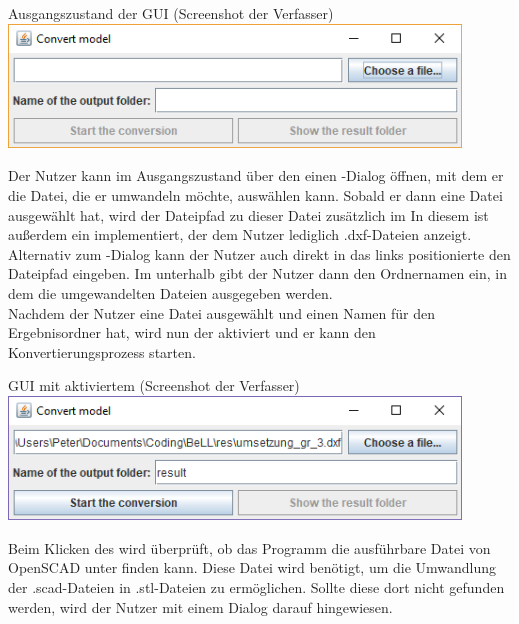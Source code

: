 \begin{Bild}{Ausgangszustand der GUI (Screenshot der Verfasser)}
	\includegraphics[width = 120mm]{Bilder/GUI/GUI_Startup}
\end{Bild}

Der Nutzer kann im Ausgangszustand über den  einen -Dialog öffnen, mit dem er die Datei, die er umwandeln möchte, auswählen kann.
Sobald er dann eine Datei ausgewählt hat, wird der Dateipfad zu dieser Datei zusätzlich im 
In diesem  ist außerdem ein  implementiert, der dem Nutzer lediglich .dxf-Dateien anzeigt.
Alternativ zum -Dialog kann der Nutzer auch direkt in das links positionierte  den Dateipfad eingeben.
Im  unterhalb gibt der Nutzer dann den Ordnernamen ein, in dem die umgewandelten Dateien ausgegeben werden. \\
Nachdem der Nutzer eine Datei ausgewählt und einen Namen für den Ergebnisordner hat, wird nun der  aktiviert und er kann den Konvertierungsprozess starten.

\begin{Bild}{GUI mit aktiviertem  (Screenshot der Verfasser)}
	\includegraphics[width = 120mm]{Bilder/GUI/GUI_Convert_Ready}
\end{Bild}

Beim Klicken des  wird überprüft, ob das Programm die ausführbare Datei von OpenSCAD unter  finden kann.
Diese Datei wird benötigt, um die Umwandlung der .scad-Dateien in .stl-Dateien zu ermöglichen.
Sollte diese dort nicht gefunden werden, wird der Nutzer mit einem Dialog darauf hingewiesen.

